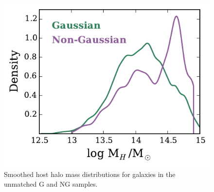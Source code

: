 \documentclass[a4paper,fleqn,usenatbib]{mnras}
\begin{document}
\begin{figure}
  \centering
  \includegraphics[width=\columnwidth]{mhdist_um.pdf}
  \caption{Smoothed host halo mass distributions for galaxies in the
    unmatched G and NG samples.}
  \label{fig:mhdist_um}
\end{figure}
\end{document}
